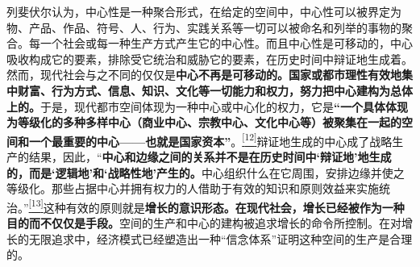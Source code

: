\documentclass[UTF8, fontset = sourcesans, a4paper, oneside, zihao =
-4, scheme=chinese, no-math, space=true]{ctexbook}
\begin{document}
列斐伏尔认为，中心性是一种聚合形式，在给定的空间中，中心性可以被界定为物、产品、作品、符号、人、行为、实践关系等一切可以被命名和列举的事物的聚合。每一个社会或每一种生产方式产生它的中心性。而且中心性是可移动的，中心吸收构成它的要素，排除受它统治和威胁它的要素，在历史时间中辩证地生成着。然而，现代社会与之不同的仅仅是\textbf{中心不再是可移动的。国家或都市理性有效地集中财富、行为方式、信息、知识、文化等一切能力和权力，努力把中心建构为总体上的。}于是，现代都市空间体现为一种中心或中心化的权力，它是\textbf{``一个具体体现为等级化的多种多样中心（商业中心、宗教中心、文化中心等）被聚集在一起的空间和一个最重要的中心------也就是国家资本''}。\protect\hypertarget{part0008_split_001.htmlux5cux23w12}{}{}\protect\hyperlink{part0008_split_003.htmlux5cux23m12}{\textsuperscript{{[}12{]}}}辩证地生成的中心成了战略生产的结果，因此，``\textbf{中心和边缘之间的关系并不是在历史时间中`辩证地'地生成的，而是`逻辑地'和`战略性地'产生的。}中心组织什么在它周围，安排边缘并使之等级化。那些占据中心并拥有权力的人借助于有效的知识和原则效益来实施统治。''\protect\hypertarget{part0008_split_001.htmlux5cux23w13}{}{}\protect\hyperlink{part0008_split_003.htmlux5cux23m13}{\textsuperscript{{[}13{]}}}这种有效的原则就是\textbf{增长的意识形态。在现代社会，增长已经被作为一种目的而不仅仅是手段。}空间的生产和中心的建构被追求增长的命令所控制。在对增长的无限追求中，经济模式已经塑造出一种``信念体系''证明这种空间的生产是合理的。
\end{document}
